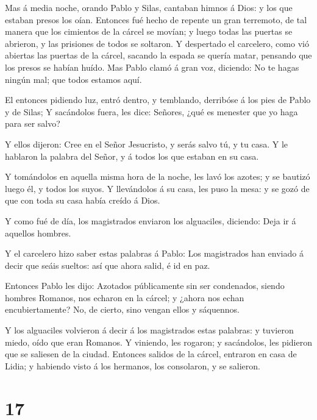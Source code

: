  Mas á media noche, orando Pablo y Silas, cantaban himnos á
Dios: y los que estaban presos los oían.  Entonces fué
hecho de repente un gran terremoto, de tal manera que los cimientos de
la cárcel se movían; y luego todas las puertas se abrieron, y las
prisiones de todos se soltaron.  Y despertado el carcelero,
como vió abiertas las puertas de la cárcel, sacando la espada se quería
matar, pensando que los presos se habían huído.  Mas Pablo
clamó á gran voz, diciendo: No te hagas ningún mal; que todos estamos
aquí.

 El entonces pidiendo luz, entró dentro, y temblando,
derribóse á los pies de Pablo y de Silas;  Y sacándolos
fuera, les dice: Señores, ¿qué es menester que yo haga para ser salvo?

 Y ellos dijeron: Cree en el Señor Jesucristo, y serás
salvo tú, y tu casa.  Y le hablaron la palabra del Señor, y
á todos los que estaban en su casa.

 Y tomándolos en aquella misma hora de la noche, les lavó
los azotes; y se bautizó luego él, y todos los suyos.  Y
llevándolos á su casa, les puso la mesa: y se gozó de que con toda su
casa había creído á Dios.

 Y como fué de día, los magistrados enviaron los
alguaciles, diciendo: Deja ir á aquellos hombres.

 Y el carcelero hizo saber estas palabras á Pablo: Los
magistrados han enviado á decir que seáis sueltos: así que ahora salid,
é id en paz.

 Entonces Pablo les dijo: Azotados públicamente sin ser
condenados, siendo hombres Romanos, nos echaron en la cárcel; y ¿ahora
nos echan encubiertamente? No, de cierto, sino vengan ellos y sáquennos.

 Y los alguaciles volvieron á decir á los magistrados estas
palabras: y tuvieron miedo, oído que eran Romanos.  Y
viniendo, les rogaron; y sacándolos, les pidieron que se saliesen de la
ciudad.  Entonces salidos de la cárcel, entraron en casa de
Lidia; y habiendo visto á los hermanos, los consolaron, y se salieron.

\hypertarget{section-16}{%
\section{17}\label{section-16}}

